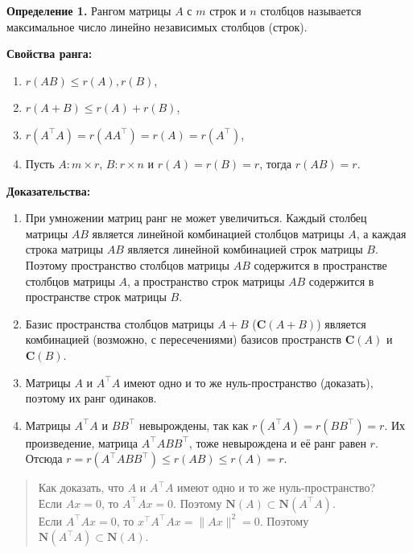 \documentclass[11pt,a4paper]{article}
\providecommand{\tightlist}{%
      \setlength{\itemsep}{0pt}\setlength{\parskip}{0pt}}
\begin{document}
    \textbf{Определение 1.} Рангом матрицы \(A\) с \(m\) строк и \(n\)
столбцов называется максимальное число линейно независимых столбцов
(строк).

    \textbf{Свойства ранга:}

\begin{enumerate}
\def\labelenumi{\arabic{enumi}.}
\tightlist
\item
  \(r(AB) \le r(A), r(B)\),
\item
  \(r(A+B) \le r(A) + r(B)\),
\item
  \(r(A^\top A) = r(AA^\top) = r(A) = r(A^\top)\),
\item
  Пусть \(A: m \times r\), \(B: r \times n\) и \(r(A) = r(B) = r\),
  тогда \(r(AB) = r\).
\end{enumerate}

\textbf{Доказательства:}

\begin{enumerate}
\def\labelenumi{\arabic{enumi}.}
\tightlist
\item
  При умножении матриц ранг не может увеличиться. Каждый столбец матрицы
  \(AB\) является линейной комбинацией столбцов матрицы \(A\), а каждая
  строка матрицы \(AB\) является линейной комбинацией строк матрицы
  \(B\). Поэтому пространство столбцов матрицы \(AB\) содержится в
  пространстве столбцов матрицы \(A\), а пространство строк матрицы
  \(AB\) содержится в пространстве строк матрицы \(B\).
\item
  Базис пространства столбцов матрицы \(A+B\) (\(\mathbf{C}(A+B)\))
  является комбинацией (возможно, с пересечениями) базисов пространств
  \(\mathbf{C}(A)\) и \(\mathbf{C}(B)\).
\item
  Матрицы \(A\) и \(A^\top A\) имеют одно и то же нуль-пространство
  (доказать), поэтому их ранг одинаков.
\item
  Матрицы \(A^\top A\) и \(BB^\top\) невырождены, так как
  \(r(A^\top A) = r(BB^\top) = r\). Их произведение, матрица
  \(A^\top A BB^\top\), тоже невырождена и её ранг равен \(r\). Отсюда
  \(r = r(A^\top A BB^\top) \le r(AB) \le r(A) = r\).
\end{enumerate}

    \begin{quote}
Как доказать, что \(A\) и \(A^\top A\) имеют одно и то же
нуль-пространство?\\
Если \(Ax=0\), то \(A^\top Ax = 0\). Поэтому
\(\mathbf{N}(A) \subset \mathbf{N}(A^\top A)\).\\
Если \(A^\top Ax = 0\), то \(x^\top A^\top Ax = \|Ax\|^2 = 0\). Поэтому
\(\mathbf{N}(A^\top A) \subset \mathbf{N}(A)\).
\end{quote}
\end{document}
